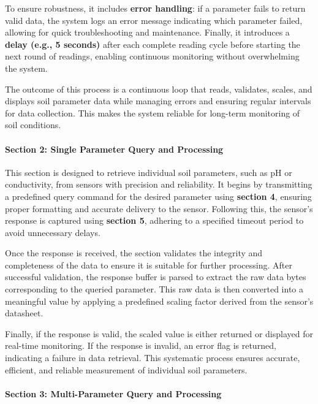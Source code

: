 \documentclass{book} %
\begin{document}
\noindent To ensure robustness, it includes \textbf{error handling}: if a parameter fails to return valid data, the system logs an error message indicating which parameter failed, allowing for quick troubleshooting and maintenance. Finally, it introduces a \textbf{delay (e.g., 5 seconds)} after each complete reading cycle before starting the next round of readings, enabling continuous monitoring without overwhelming the system.

\noindent The outcome of this process is a continuous loop that reads, validates, scales, and displays soil parameter data while managing errors and ensuring regular intervals for data collection. This makes the system reliable for long-term monitoring of soil conditions.

\noindent 

\noindent 
\paragraph{Section 2: Single Parameter Query and Processing}

\noindent This section is designed to retrieve individual soil parameters, such as pH or conductivity, from sensors with precision and reliability. It begins by transmitting a predefined query command for the desired parameter using \textbf{section 4}, ensuring proper formatting and accurate delivery to the sensor. Following this, the sensor's response is captured using \textbf{section 5}, adhering to a specified timeout period to avoid unnecessary delays.

\noindent Once the response is received, the section validates the integrity and completeness of the data to ensure it is suitable for further processing. After successful validation, the response buffer is parsed to extract the raw data bytes corresponding to the queried parameter. This raw data is then converted into a meaningful value by applying a predefined scaling factor derived from the sensor's datasheet.

\noindent Finally, if the response is valid, the scaled value is either returned or displayed for real-time monitoring. If the response is invalid, an error flag is returned, indicating a failure in data retrieval. This systematic process ensures accurate, efficient, and reliable measurement of individual soil parameters.

\noindent 

\noindent 
\paragraph{Section 3: Multi-Parameter Query and Processing}
\end{document}
